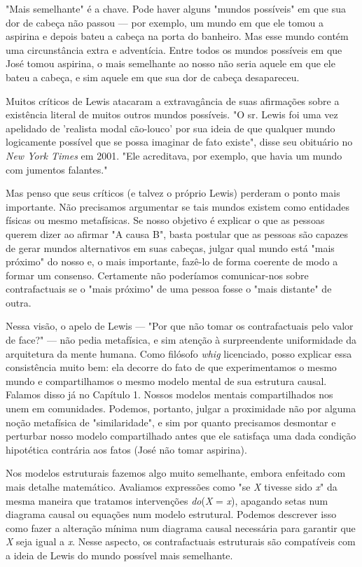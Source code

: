 \documentclass[11pt,a5paper,twoside]{book}
\begin{document}
"Mais semelhante" é a chave. Pode haver alguns "mundos possíveis" em que sua dor de cabeça não passou — por exemplo, um mundo em que ele tomou a aspirina e depois bateu a cabeça na porta do banheiro. Mas esse mundo contém uma circunstância extra e adventícia. Entre todos os mundos possíveis em que José tomou aspirina, o mais semelhante ao nosso não seria aquele em que ele bateu a cabeça, e sim aquele em que sua dor de cabeça desapareceu.

Muitos críticos de Lewis atacaram a extravagância de suas afirmações sobre a existência literal de muitos outros mundos possíveis. "O sr. Lewis foi uma vez apelidado de 'realista modal cão-louco' por sua ideia de que qualquer mundo logicamente possível que se possa imaginar de fato existe", disse seu obituário no \textit{New York Times} em 2001. "Ele acreditava, por exemplo, que havia um mundo com jumentos falantes."

Mas penso que seus críticos (e talvez o próprio Lewis) perderam o ponto mais importante. Não precisamos argumentar se tais mundos existem como entidades físicas ou mesmo metafísicas. Se nosso objetivo é explicar o que as pessoas querem dizer ao afirmar "A causa B", basta postular que as pessoas são capazes de gerar mundos alternativos em suas cabeças, julgar qual mundo está "mais próximo" do nosso e, o mais importante, fazê-lo de forma coerente de modo a formar um consenso. Certamente não poderíamos comunicar-nos sobre contrafactuais se o "mais próximo" de uma pessoa fosse o "mais distante" de outra.

Nessa visão, o apelo de Lewis — "Por que não tomar os contrafactuais pelo valor de face?" — não pedia metafísica, e sim atenção à surpreendente uniformidade da arquitetura da mente humana. Como filósofo \textit{whig} licenciado, posso explicar essa consistência muito bem: ela decorre do fato de que experimentamos o mesmo mundo e compartilhamos o mesmo modelo mental de sua estrutura causal. Falamos disso já no Capítulo 1. Nossos modelos mentais compartilhados nos unem em comunidades. Podemos, portanto, julgar a proximidade não por alguma noção metafísica de "similaridade", e sim por quanto precisamos desmontar e perturbar nosso modelo compartilhado antes que ele satisfaça uma dada condição hipotética contrária aos fatos (José não tomar aspirina).

Nos modelos estruturais fazemos algo muito semelhante, embora enfeitado com mais detalhe matemático. Avaliamos expressões como "se \textit{X} tivesse sido \textit{x}" da mesma maneira que tratamos intervenções \textit{do}(\textit{X} = \textit{x}), apagando setas num diagrama causal ou equações num modelo estrutural. Podemos descrever isso como fazer a alteração mínima num diagrama causal necessária para garantir que \textit{X} seja igual a \textit{x}. Nesse aspecto, os contrafactuais estruturais são compatíveis com a ideia de Lewis do mundo possível mais semelhante.
\end{document}
